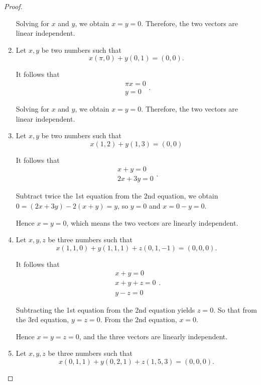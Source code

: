 \begin{proof}
\begin{enumerate}[label={(\alph*)},itemsep=0pt]
              Solving for $x$ and $y$, we obtain $x = y = 0$. Therefore, the two vectors are linear independent.
        \item Let $x, y$ be two numbers such that
              \[
                  x(\pi, 0) + y(0, 1) = (0, 0).
              \]

              It follows that
              \[
                  \begin{split}
                      \pi x = 0 \\
                      y = 0
                  \end{split}.
              \]

              Solving for $x$ and $y$, we obtain $x = y = 0$. Therefore, the two vectors are linear independent.
        \item Let $x, y$ be two numbers such that
              \[
                  x(1, 2) + y(1, 3) = (0, 0)
              \]

              It follows that
              \[
                  \begin{split}
                      x + y = 0 \\
                      2x + 3y = 0
                  \end{split}.
              \]

              Subtract twice the 1st equation from the 2nd equation, we obtain $0 = (2x + 3y) - 2(x + y) = y$, so $y = 0$ and $x = 0 - y = 0$.

              Hence $x = y = 0$, which means the two vectors are linearly independent.
        \item Let $x, y, z$ be three numbers such that
              \[
                  x(1, 1, 0) + y(1, 1, 1) + z(0, 1, -1) = (0, 0, 0).
              \]

              It follows that
              \[
                  \begin{split}
                      x + y = 0 \\
                      x + y + z = 0 \\
                      y - z = 0
                  \end{split}.
              \]

              Subtracting the 1st equation from the 2nd equation yields $z = 0$. So that from the 3rd equation, $y = z = 0$. From the 2nd equation, $x = 0$.

              Hence $x = y = z = 0$, and the three vectors are linearly independent.
        \item Let $x, y, z$ be three numbers such that
              \[
                  x(0, 1, 1) + y(0, 2, 1) + z(1, 5, 3) = (0, 0, 0).
              \]


\end{enumerate}
\end{proof}
